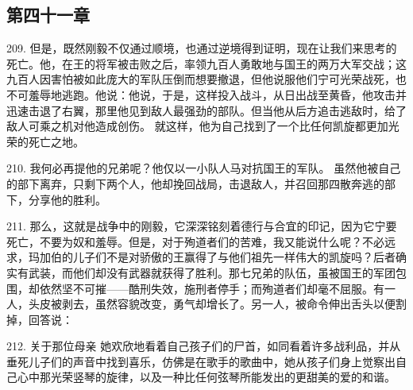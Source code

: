 
\subsection{第四十一章}

\par

209. 但是，既然刚毅不仅通过顺境，也通过逆境得到证明，现在让我们来思考的死亡。他，在王的将军被击败之后，率领九百人勇敢地与国王的两万大军交战；这九百人因害怕被如此庞大的军队压倒而想要撤退，但他说服他们宁可光荣战死，也不可羞辱地逃跑。他说：他说，于是，这样投入战斗，从日出战至黄昏，他攻击并迅速击退了右翼，那里他见到敌人最强劲的部队。但当他从后方追击逃敌时，给了敌人可乘之机对他造成创伤。 就这样，他为自己找到了一个比任何凯旋都更加光荣的死亡之地。\par

210. 我何必再提他的兄弟呢？他仅以一小队人马对抗国王的军队。 虽然他被自己的部下离弃，只剩下两个人，他却挽回战局，击退敌人，并召回那四散奔逃的部下，分享他的胜利。\par

211. 那么，这就是战争中的刚毅，它深深铭刻着德行与合宜的印记，因为它宁要死亡，不要为奴和羞辱。但是，对于殉道者们的苦难，我又能说什么呢？不必远求，玛加伯的儿子们不是对骄傲的王赢得了与他们祖先一样伟大的凯旋吗？后者确实有武装，而他们却没有武器就获得了胜利。那七兄弟的队伍，虽被国王的军团包围，却依然坚不可摧——酷刑失效，施刑者停手；而殉道者们却毫不屈服。有一人，头皮被剥去，虽然容貌改变，勇气却增长了。另一人，被命令伸出舌头以便割掉，回答说：\par

212. 关于那位母亲 她欢欣地看着自己孩子们的尸首，如同看着许多战利品，并从垂死儿子们的声音中找到喜乐，仿佛是在歌手的歌曲中，她从孩子们身上觉察出自己心中那光荣竖琴的旋律，以及一种比任何弦琴所能发出的更甜美的爱的和谐。\par

